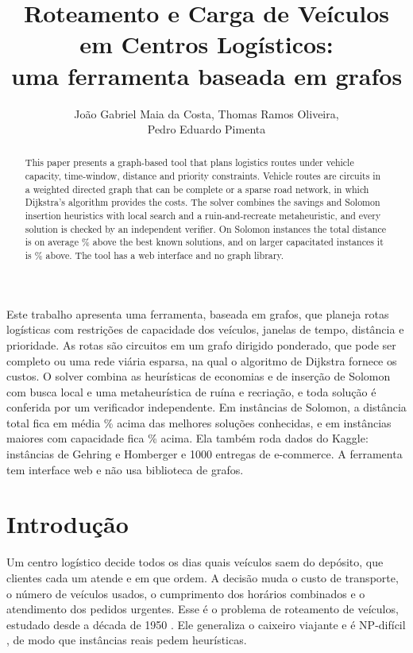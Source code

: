 \documentclass[12pt]{article}
\title{Roteamento e Carga de Veículos em Centros Logísticos:\\ uma ferramenta baseada em grafos}
\author{João Gabriel Maia da Costa\inst{1}, Thomas Ramos Oliveira\inst{1},\\ Pedro Eduardo Pimenta\inst{1}}
\begin{document}
\maketitle

\begin{abstract}
This paper presents a graph-based tool that plans logistics routes under vehicle capacity, time-window, distance and priority constraints. Vehicle routes are circuits in a weighted directed graph that can be complete or a sparse road network, in which Dijkstra's algorithm provides the costs. The solver combines the savings and Solomon insertion heuristics with local search and a ruin-and-recreate metaheuristic, and every solution is checked by an independent verifier. On \solN{} Solomon instances the total distance is on average \solGapMedioEn\% above the best known solutions, and on \xN{} larger capacitated instances it is \xGapMedioEn\% above. The tool has a web interface and no graph library.
\end{abstract}

\begin{resumo}
Este trabalho apresenta uma ferramenta, baseada em grafos, que planeja rotas logísticas com restrições de capacidade dos veículos, janelas de tempo, distância e prioridade. As rotas são circuitos em um grafo dirigido ponderado, que pode ser completo ou uma rede viária esparsa, na qual o algoritmo de Dijkstra fornece os custos. O solver combina as heurísticas de economias e de inserção de Solomon com busca local e uma metaheurística de ruína e recriação, e toda solução é conferida por um verificador independente. Em \solN{} instâncias de Solomon, a distância total fica em média \solGapMedio\% acima das melhores soluções conhecidas, e em \xN{} instâncias maiores com capacidade fica \xGapMedio\% acima. Ela também roda dados do Kaggle: instâncias de Gehring e Homberger e 1000 entregas de e-commerce. A ferramenta tem interface web e não usa biblioteca de grafos.
\end{resumo}

\section{Introdução}

Um centro logístico decide todos os dias quais veículos saem do depósito, que clientes cada um atende e em que ordem. A decisão muda o custo de transporte, o número de veículos usados, o cumprimento dos horários combinados e o atendimento dos pedidos urgentes. Esse é o problema de roteamento de veículos, estudado desde a década de 1950 \cite{dantzig1959,tothvigo2014}. Ele generaliza o caixeiro viajante e é NP-difícil \cite{lenstra1981}, de modo que instâncias reais pedem heurísticas.
\end{document}
